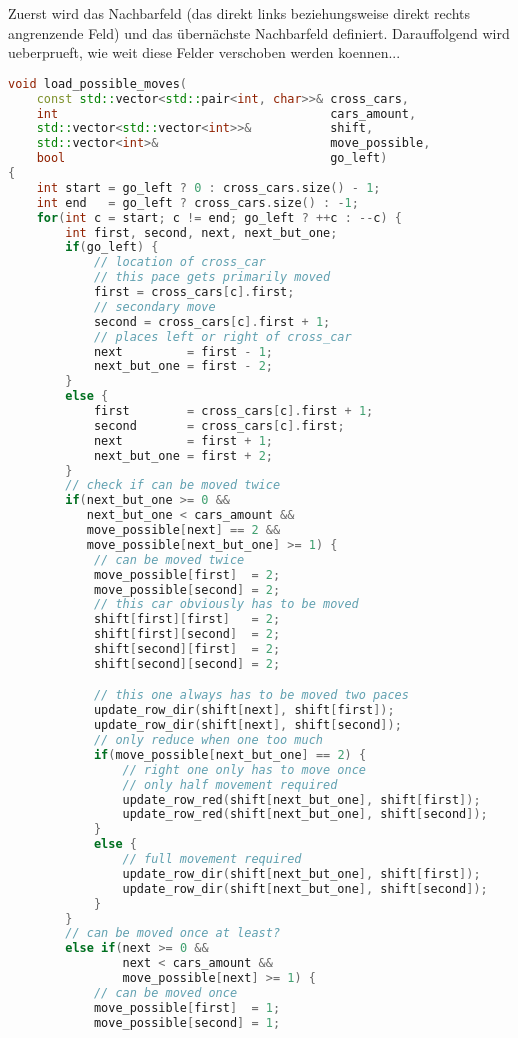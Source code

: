 \documentclass[a4paper,10pt,ngerman]{scrartcl}
\begin{document}
Zuerst wird das Nachbarfeld (das direkt links beziehungsweise direkt rechts angrenzende Feld) und das übernächste Nachbarfeld definiert.
Darauffolgend wird ueberprueft, wie weit diese Felder verschoben werden koennen...
\begin{lstlisting}[language=C++]
void load_possible_moves(
    const std::vector<std::pair<int, char>>& cross_cars,
    int                                      cars_amount,
    std::vector<std::vector<int>>&           shift,
    std::vector<int>&                        move_possible,
    bool                                     go_left)
{
    int start = go_left ? 0 : cross_cars.size() - 1;
    int end   = go_left ? cross_cars.size() : -1;
    for(int c = start; c != end; go_left ? ++c : --c) {
        int first, second, next, next_but_one;
        if(go_left) {
            // location of cross_car
            // this pace gets primarily moved
            first = cross_cars[c].first;
            // secondary move
            second = cross_cars[c].first + 1;
            // places left or right of cross_car
            next         = first - 1;
            next_but_one = first - 2;
        }
        else {
            first        = cross_cars[c].first + 1;
            second       = cross_cars[c].first;
            next         = first + 1;
            next_but_one = first + 2;
        }
        // check if can be moved twice
        if(next_but_one >= 0 &&
           next_but_one < cars_amount &&
           move_possible[next] == 2 &&
           move_possible[next_but_one] >= 1) {
            // can be moved twice
            move_possible[first]  = 2;
            move_possible[second] = 2;
            // this car obviously has to be moved
            shift[first][first]   = 2;
            shift[first][second]  = 2;
            shift[second][first]  = 2;
            shift[second][second] = 2;

            // this one always has to be moved two paces
            update_row_dir(shift[next], shift[first]);
            update_row_dir(shift[next], shift[second]);
            // only reduce when one too much
            if(move_possible[next_but_one] == 2) {
                // right one only has to move once
                // only half movement required
                update_row_red(shift[next_but_one], shift[first]);
                update_row_red(shift[next_but_one], shift[second]);
            }
            else {
                // full movement required
                update_row_dir(shift[next_but_one], shift[first]);
                update_row_dir(shift[next_but_one], shift[second]);
            }
        }
        // can be moved once at least?
        else if(next >= 0 &&
                next < cars_amount &&
                move_possible[next] >= 1) {
            // can be moved once
            move_possible[first]  = 1;
            move_possible[second] = 1;


\end{lstlisting}
\end{document}
